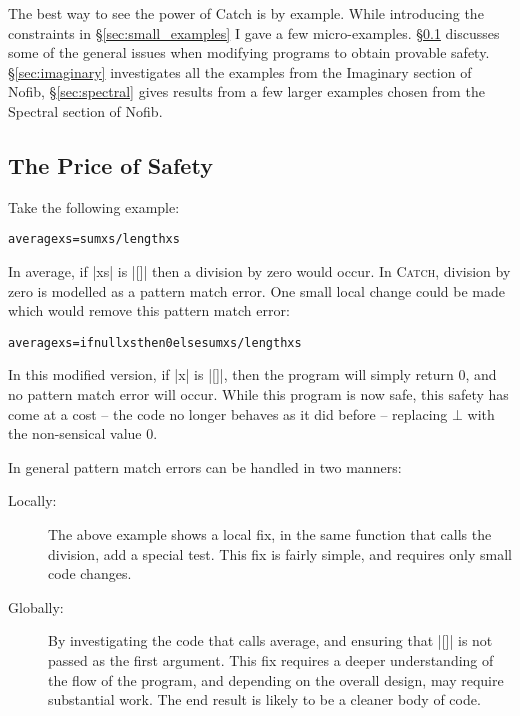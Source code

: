 \documentclass[preprint]{sigplanconf}
\newcommand{\C}[1]{\textsf{#1}}
\newcommand{\catch}{\textsc{Catch}}
\newenvironment{code}{\begin{alltt}\small}{\end{alltt}}
\begin{document}
The best way to see the power of Catch is by example. While introducing the constraints in \S\ref{sec:small_examples} I gave a few micro-examples. \S\ref{sec:safety} discusses some of the general issues when modifying programs to obtain provable safety. \S\ref{sec:imaginary} investigates all the examples from the Imaginary section of Nofib, \S\ref{sec:spectral} gives results from a few larger examples chosen from the Spectral section of Nofib.

\subsection{The Price of Safety}
\label{sec:safety}

Take the following example:

\begin{code}
average xs = sum xs / length xs
\end{code}

In \C{average}, if |xs| is |[]| then a division by zero would occur. In \catch{}, division by zero is modelled as a pattern match error. One small local change could be made which would remove this pattern match error:

\begin{code}
average xs = if null xs then 0 else sum xs / length xs
\end{code}

In this modified version, if |x| is |[]|, then the program will simply return 0, and no pattern match error will occur. While this program is now safe, this safety has come at a cost -- the code no longer behaves as it did before -- replacing $\bot{}$ with the non-sensical value 0.

In general pattern match errors can be handled in two manners:

\begin{description}
\item [Locally:] The above example shows a local fix, in the same function that calls the division, add a special test. This fix is fairly simple, and requires only small code changes.

\item [Globally:] By investigating the code that calls \C{average}, and ensuring that |[]| is not passed as the first argument. This fix requires a deeper understanding of the flow of the program, and depending on the overall design, may require substantial work. The end result is likely to be a cleaner body of code.
\end{description}
\end{document}
